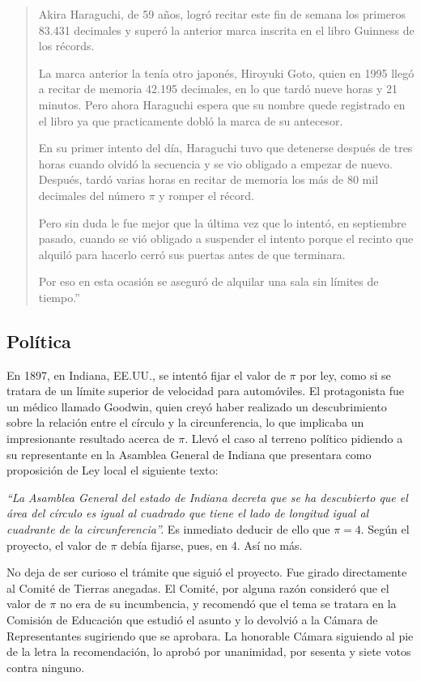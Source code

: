 {\begin{quote}
Akira Haraguchi, de 59 años, logró recitar este fin de semana los primeros 83.431 decimales y superó la anterior 
marca inscrita en el libro Guinness de los récords.

La marca anterior la tenía otro japonés, Hiroyuki Goto, quien en 1995 llegó a recitar de memoria 42.195 decimales, 
en lo que tardó nueve horas y 21 minutos. Pero ahora Haraguchi espera que su nombre quede registrado en el libro 
ya que practicamente dobló la marca de su antecesor.

En su primer intento del día, Haraguchi tuvo que detenerse después de tres horas cuando olvidó la secuencia y 
se vio obligado a empezar de nuevo. Después, tardó varias horas en recitar de memoria los más de 80 mil decimales 
del número $\pi$ y romper el récord. 

Pero sin duda le fue mejor que la última vez que lo intentó, en septiembre pasado, cuando se vió obligado a 
suspender el intento porque el recinto que alquiló para hacerlo cerró sus puertas antes de que terminara.

Por eso en esta ocasión se aseguró de alquilar una sala sin límites de tiempo.''
\end{quote}

\subsection*{Política}
En 1897, en Indiana, EE.UU., se intentó fijar el valor de $\pi$ por ley, como si se tratara de un límite superior de velocidad para automóviles. 
El protagonista fue un médico llamado Goodwin, quien creyó haber realizado un descubrimiento sobre la relación entre el círculo y la circunferencia, 
lo que implicaba un impresionante resultado acerca de $\pi$. Llevó el caso al terreno político pidiendo a su representante en la Asamblea General de Indiana 
que presentara como proposición de Ley local el siguiente texto: 

\textit{``La Asamblea General del estado de Indiana decreta que se ha descubierto que el área del círculo es igual al cuadrado 
que tiene el lado de longitud igual al cuadrante de la circunferencia''.} Es inmediato deducir de ello que $\pi = 4$. 
Según el proyecto, el valor de $\pi$ debía fijarse, pues, en 4. Así no más.

No deja de ser curioso el trámite que siguió el proyecto. Fue girado directamente al Comité de Tierras anegadas. El Comité, 
por alguna razón consideró que el valor de $\pi$ no era de su incumbencia, y recomendó que el tema se tratara en la Comisión 
de Educación que estudió el asunto y lo devolvió a la Cámara de Representantes sugiriendo que se aprobara. La honorable Cámara siguiendo 
al pie de la letra la recomendación, lo aprobó por unanimidad, por sesenta y siete votos contra ninguno.

}
